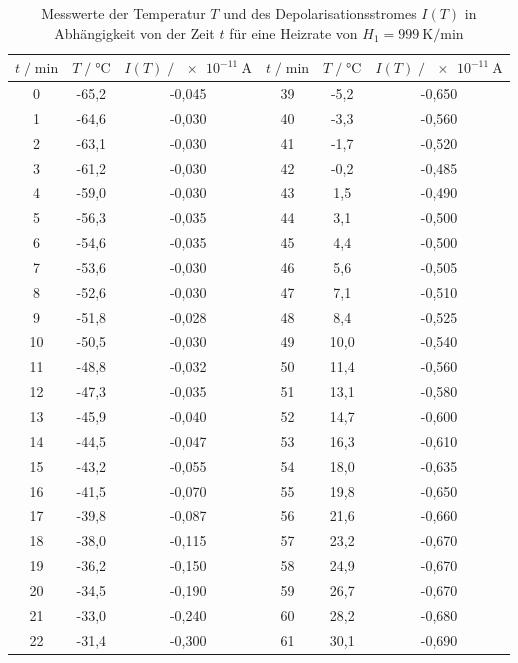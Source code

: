 \begin{table}
  \centering
  \caption{Messwerte der Temperatur $T$ und des Depolarisationsstromes $I(T)$ in Abhängigkeit von der Zeit $t$ für eine
  Heizrate von $H_1= \SI{999}{\kelvin\per\minute}$}
  \label{tab:mess1}
  \begin{tabular}{c c c c c c}
  \toprule
  $t \;/\; \si{\minute}$ & $T \;/\; \si{\celsius}$ & $I(T) \;/\; \SI{e-11}{\ampere}$ & 
  $t \;/\; \si{\minute}$ & $T \;/\; \si{\celsius}$ & $I(T) \;/\; \SI{e-11}{\ampere}$ \\
  \midrule
      0 & -65,2 & -0,045 & 39 & -5,2 & -0,650 \\
      1 & -64,6 & -0,030 & 40 & -3,3 & -0,560 \\
      2 & -63,1 & -0,030 & 41 & -1,7 & -0,520 \\
      3 & -61,2 & -0,030 & 42 & -0,2 & -0,485 \\
      4 & -59,0 & -0,030 & 43 &  1,5 & -0,490 \\
      5 & -56,3 & -0,035 & 44 &  3,1 & -0,500 \\
      6 & -54,6 & -0,035 & 45 &  4,4 & -0,500 \\
      7 & -53,6 & -0,030 & 46 &  5,6 & -0,505 \\
      8 & -52,6 & -0,030 & 47 &  7,1 & -0,510 \\
      9 & -51,8 & -0,028 & 48 &  8,4 & -0,525 \\
     10 & -50,5 & -0,030 & 49 & 10,0 & -0,540 \\
     11 & -48,8 & -0,032 & 50 & 11,4 & -0,560 \\
     12 & -47,3 & -0,035 & 51 & 13,1 & -0,580 \\
     13 & -45,9 & -0,040 & 52 & 14,7 & -0,600 \\
     14 & -44,5 & -0,047 & 53 & 16,3 & -0,610 \\
     15 & -43,2 & -0,055 & 54 & 18,0 & -0,635 \\
     16 & -41,5 & -0,070 & 55 & 19,8 & -0,650 \\
     17 & -39,8 & -0,087 & 56 & 21,6 & -0,660 \\
     18 & -38,0 & -0,115 & 57 & 23,2 & -0,670 \\
     19 & -36,2 & -0,150 & 58 & 24,9 & -0,670 \\
     20 & -34,5 & -0,190 & 59 & 26,7 & -0,670 \\
     21 & -33,0 & -0,240 & 60 & 28,2 & -0,680 \\
     22 & -31,4 & -0,300 & 61 & 30,1 & -0,690 \\

\end{tabular}
\end{table}
